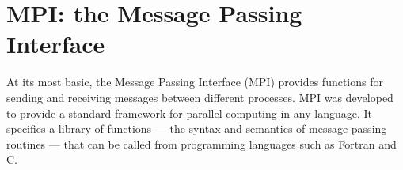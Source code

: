 \labdependencies{}

\begin{comment}
When a single processor takes too long to perform a computationally intensive task, there are two simple solutions.
The first is simply to build a faster processor.
Unfortunately, physics gets in the way.
In particular, the problem of heat dissipation has kept processor speeds from increasing as quickly in recent years as they did in the past.
The second solution is to have multiple processors work together on the same task.
This is the main idea behind parallel computing.

Today, high computing performance is achieved using many processors.
These processors communicate with each other and coordinate their tasks with a message passing system.
Essentially, a `supercomputer' is made up of many normal computers, each with its own memory.
These normal computers are all running the same program, but each takes a different execution path through the code as a result of the interactions that message passing makes possible.

Taking advantage of parallel processors is challenging; one cannot simply take a traditional program and expect it to run faster on a supercomputer because such programs consists of a single process --- a set of instructions to be executed sequentially.
A parallel program must be written which consists of many processes which can be executed simultaneously.
\end{comment}

\section*{MPI: the Message Passing Interface}

At its most basic, the Message Passing Interface (MPI) provides functions for sending and receiving messages between different processes.
MPI was developed to provide a standard framework for parallel computing in any language.
It specifies a library of functions --- the syntax and semantics of message passing routines --- that can be called from programming languages such as Fortran and C.

